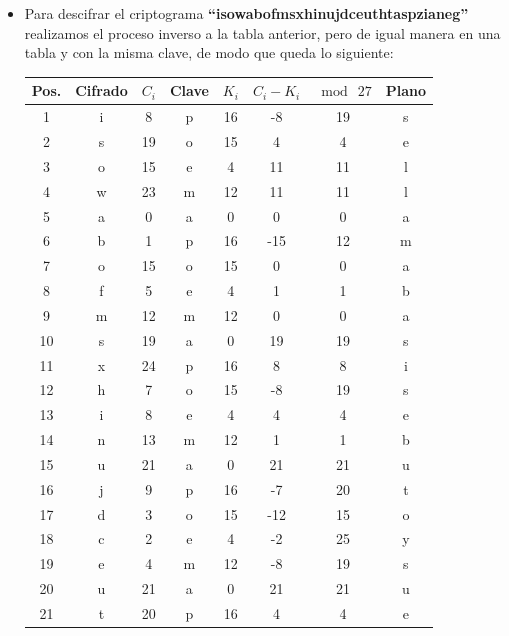\begin{itemize}
            Eso resulta en el criptograma \textbf{``fsvfecsguokbesrphiaohoosovsypaanexgepvhte''}

    \item Para descifrar el criptograma \textbf{``isowabofmsxhinujdceuthtaspzianeg''} realizamos el proceso
    inverso a la tabla anterior, pero de igual manera en una tabla y con la misma clave, de modo que
    queda lo siguiente:

        \begin{table}[H]
        \centering
        \begin{tabular}{|c|c|c|c|c|c|c|c|}
        \hline
        \textbf{Pos.} & \textbf{Cifrado} & $C_i$ & \textbf{Clave} & $K_i$ & $C_i-K_i$ & $\bmod\ 27$ & \textbf{Plano} \\
        \hline
        1  & i & 8  & p & 16 & -8  & 19 & s \\
        2  & s & 19 & o & 15 & 4   & 4  & e \\
        3  & o & 15 & e & 4  & 11  & 11 & l \\
        4  & w & 23 & m & 12 & 11  & 11 & l \\
        5  & a & 0  & a & 0  & 0   & 0  & a \\
        6  & b & 1  & p & 16 & -15 & 12 & m \\
        7  & o & 15 & o & 15 & 0   & 0  & a \\
        8  & f & 5  & e & 4  & 1   & 1  & b \\
        9  & m & 12 & m & 12 & 0   & 0  & a \\
        10 & s & 19 & a & 0  & 19  & 19 & s \\
        11 & x & 24 & p & 16 & 8   & 8  & i \\
        12 & h & 7  & o & 15 & -8  & 19 & s \\
        13 & i & 8  & e & 4  & 4   & 4  & e \\
        14 & n & 13 & m & 12 & 1   & 1  & b \\
        15 & u & 21 & a & 0  & 21  & 21 & u \\
        16 & j & 9  & p & 16 & -7  & 20 & t \\
        17 & d & 3  & o & 15 & -12 & 15 & o \\
        18 & c & 2  & e & 4  & -2  & 25 & y \\
        19 & e & 4  & m & 12 & -8  & 19 & s \\
        20 & u & 21 & a & 0  & 21  & 21 & u \\
        21 & t & 20 & p & 16 & 4   & 4  & e \\

\end{tabular}
\end{table}
\end{itemize}
